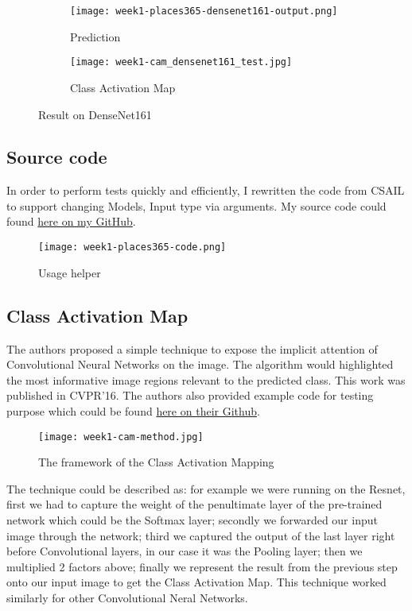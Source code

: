 \newpage
\begin{figure}[!ht]
\centering
\begin{subfigure}{0.7\textwidth}
  \centering
  \texttt{[image: week1-places365-densenet161-output.png]}
  \caption{Prediction}
\end{subfigure}%
\begin{subfigure}{0.3\textwidth}
  \centering
  \texttt{[image: week1-cam\_densenet161\_test.jpg]}
  \caption{Class Activation Map}
\end{subfigure}
\caption{Result on DenseNet161}
\end{figure}


\subsection{Source code}
In order to perform tests quickly and efficiently, I rewritten the code from CSAIL to support changing Models, Input type via arguments. My source code could found \href{https://github.com/tlvu2697/places365/blob/tlvu2697/run_placesCNN_args.py}{here on my GitHub}.

\begin{figure}[!ht]
\centering
\texttt{[image: week1-places365-code.png]}
\caption{Usage helper}
\end{figure}

\subsection{Class Activation Map}
The authors proposed a simple technique to expose the implicit attention\cite{cam} of Convolutional Neural Networks on the image. The algorithm would highlighted the most informative image regions relevant to the predicted class. This work was published in CVPR'16. The authors also provided example code for testing purpose which could be found \href{https://github.com/metalbubble/CAM}{here on their Github}.

\begin{figure}[!ht]
\centering
\texttt{[image: week1-cam-method.jpg]}
\caption{The framework of the Class Activation Mapping}
\end{figure}

The technique could be described as: for example we were running on the Resnet, first we had to capture the weight of the penultimate layer of the pre-trained network which could be the Softmax layer; secondly we forwarded our input image through the network; third we captured the output of the last layer right before Convolutional layers, in our case it was the Pooling layer; then we multiplied 2 factors above; finally we represent the result from the previous step onto our input image to get the Class Activation Map. This technique worked similarly for other Convolutional Neral Networks.


